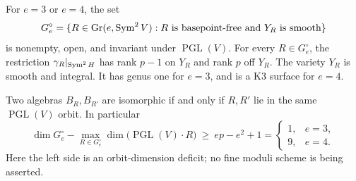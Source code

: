 \begin{proposition}
\label{prop:admissible-ramification}
For $e=3$ or $e=4$, the set
\[
 G_e^\circ=\{R\in\operatorname{Gr}(e,\operatorname{Sym}^2V):
       R\text{ is basepoint-free and }Y_R\text{ is smooth}\}
\]
is nonempty, open, and invariant under $\operatorname{PGL}(V)$.
For every $R\in G_e^\circ$, the restriction
$\gamma_R|_{\operatorname{Sym}^2H}$ has rank $p-1$ on $Y_R$ and rank $p$
off $Y_R$. The variety $Y_R$ is smooth and integral. It has genus one
for $e=3$, and is a K3 surface for $e=4$.

Two algebras $B_R,B_{R'}$ are isomorphic if and only if $R,R'$ lie
in the same $\operatorname{PGL}(V)$ orbit. In particular
\begin{equation}\label{eq:relation-moduli-deficit}
 \dim G_e^\circ-\max_{R\in G_e^\circ}
          \dim\bigl(\operatorname{PGL}(V)\cdot R\bigr)
 \ \ge\ ep-e^2+1
 =\begin{cases}1,&e=3,\\9,&e=4.\end{cases}
\end{equation}
Here the left side is an orbit-dimension deficit; no fine moduli scheme
is being asserted.
\end{proposition}
